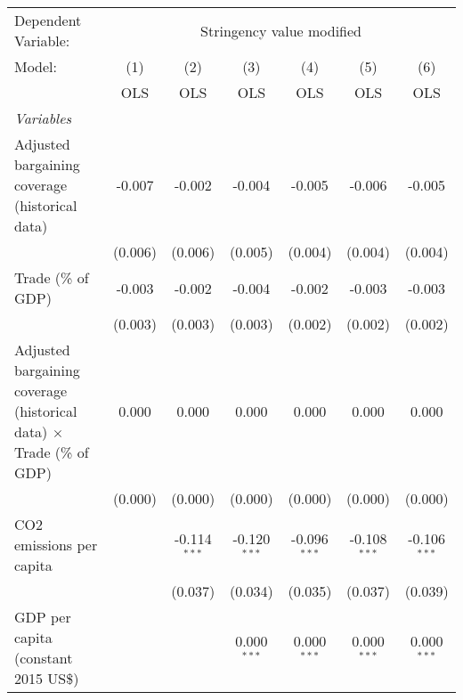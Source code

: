 
\begingroup
\centering
\begin{tabular}{lcccccc}
   \toprule
   Dependent Variable: & \multicolumn{6}{c}{Stringency value modified}\\
   Model:                                                                      & (1)     & (2)            & (3)            & (4)            & (5)            & (6)\\  
                                                                               &  OLS    & OLS            & OLS            & OLS            & OLS            & OLS\\  
   \midrule
   \emph{Variables}\\
   Adjusted bargaining coverage (historical data)                              & -0.007  & -0.002         & -0.004         & -0.005         & -0.006         & -0.005\\   
                                                                               & (0.006) & (0.006)        & (0.005)        & (0.004)        & (0.004)        & (0.004)\\   
   Trade (\% of GDP)                                                           & -0.003  & -0.002         & -0.004         & -0.002         & -0.003         & -0.003\\   
                                                                               & (0.003) & (0.003)        & (0.003)        & (0.002)        & (0.002)        & (0.002)\\   
   Adjusted bargaining coverage (historical data) $\times$ Trade (\% of GDP)   & 0.000   & 0.000          & 0.000          & 0.000          & 0.000          & 0.000\\   
                                                                               & (0.000) & (0.000)        & (0.000)        & (0.000)        & (0.000)        & (0.000)\\   
   CO2 emissions per capita                                                    &         & -0.114$^{***}$ & -0.120$^{***}$ & -0.096$^{***}$ & -0.108$^{***}$ & -0.106$^{***}$\\   
                                                                               &         & (0.037)        & (0.034)        & (0.035)        & (0.037)        & (0.039)\\   
   GDP per capita (constant 2015 US\$)                                         &         &                & 0.000$^{***}$  & 0.000$^{***}$  & 0.000$^{***}$  & 0.000$^{***}$\\   

\end{tabular}

